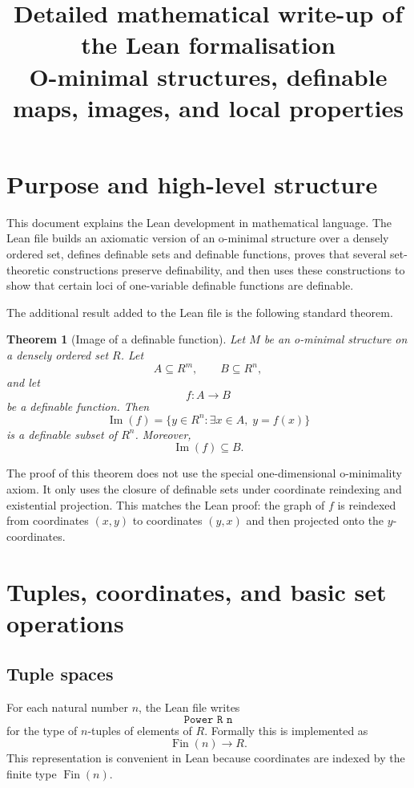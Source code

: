 \documentclass[11pt]{article}
\title{Detailed mathematical write-up of the Lean formalisation\\
O-minimal structures, definable maps, images, and local properties}
\author{}
\date{}
\newtheorem{theorem}[definition]{Theorem}
\newcommand{\Imf}{\operatorname{Im}}
\newcommand{\Lean}[1]{\texttt{#1}}
\begin{document}
\maketitle

\section{Purpose and high-level structure}

This document explains the Lean development in mathematical language.  The Lean file builds an
axiomatic version of an o-minimal structure over a densely ordered set, defines definable sets and
definable functions, proves that several set-theoretic constructions preserve definability, and then
uses these constructions to show that certain loci of one-variable definable functions are definable.

The additional result added to the Lean file is the following standard theorem.

\begin{theorem}[Image of a definable function]
Let $M$ be an o-minimal structure on a densely ordered set $R$.  Let
\[
  A\subseteq R^m,
  \qquad
  B\subseteq R^n,
\]
and let
\[
  f:A\to B
\]
be a definable function.  Then
\[
  \Imf(f)=\{y\in R^n: \exists x\in A,\; y=f(x)\}
\]
is a definable subset of $R^n$.  Moreover,
\[
  \Imf(f)\subseteq B.
\]
\end{theorem}

The proof of this theorem does not use the special one-dimensional o-minimality axiom.  It only uses
the closure of definable sets under coordinate reindexing and existential projection.  This matches
the Lean proof: the graph of $f$ is reindexed from coordinates $(x,y)$ to coordinates $(y,x)$ and then
projected onto the $y$-coordinates.

\section{Tuples, coordinates, and basic set operations}

\subsection{Tuple spaces}

For each natural number $n$, the Lean file writes
\[
  \Lean{Power R n}
\]
for the type of $n$-tuples of elements of $R$.  Formally this is implemented as
\[
  \operatorname{Fin}(n)\to R.
\]
This representation is convenient in Lean because coordinates are indexed by the finite type
$\operatorname{Fin}(n)$.
\end{document}
